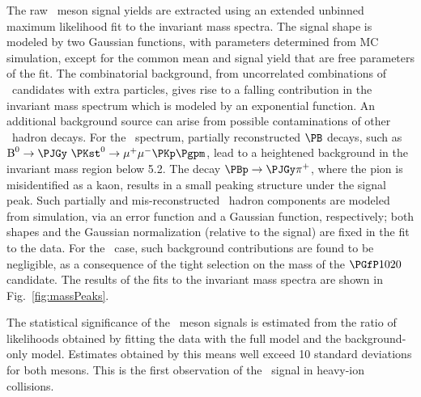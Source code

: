 \documentclass[11pt,twoside,a4paper,cmspaper]{cms-tdr}
\begin{document}
The raw \PB\ meson signal yields are extracted using an extended unbinned maximum likelihood fit to the invariant mass spectra. %
%
The signal shape is modeled by two Gaussian functions, with parameters determined from MC simulation, except for the common mean and signal yield that are free parameters of the fit.
The combinatorial background, from uncorrelated combinations of \PJGy\ candidates with extra particles,
gives rise to a falling contribution in the invariant mass spectrum which is  modeled by an exponential function.
An additional background source can arise from possible contaminations of other \PB\ hadron decays.
For the \PBp\ spectrum, partially reconstructed $\PB$ decays, such as ${\text{B}}^{0} \to \PJGy~\PKst^0 \to \mu^{+}\mu^{-}\PKp\Pgpm$, lead to a heightened background in the invariant mass region below 5.2\GeVcc.
The decay $\PBp \rightarrow \PJGy \pi^{+}$, where the pion is misidentified as a kaon, results in a small peaking structure under the signal peak.
Such partially and mis-reconstructed \PB\ hadron components are modeled from simulation, via an error function and a Gaussian function, respectively; both shapes and the Gaussian normalization (relative to the signal) are fixed in the fit to the data.   
For the \PBzs\ case, such background contributions are found to be negligible, as a consequence of the tight selection on the mass of the $\Pphi$ candidate.
%
%
The results of the fits to the invariant mass spectra are shown in Fig.~\ref{fig:massPeaks}.

The statistical significance of the \PB\ meson signals is estimated from the ratio of likelihoods obtained by fitting the data with the full model and the background-only model. Estimates obtained by this means well exceed 10 standard deviations for both mesons.  
This is the first observation of the \PBzs\ signal in heavy-ion collisions. 
\end{document}
